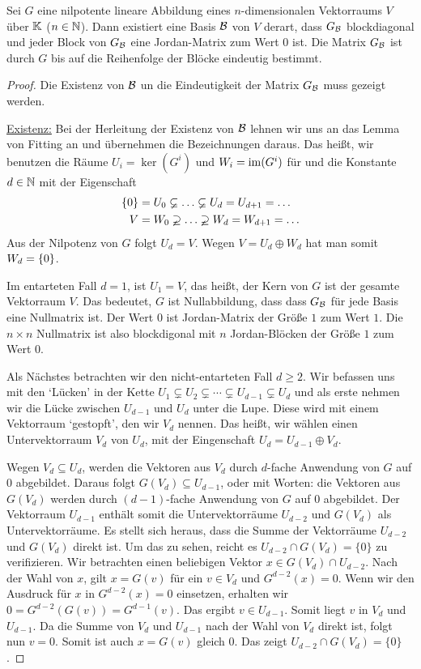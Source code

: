 \begin{thm}
	Sei $ G $ eine nilpotente lineare Abbildung eines $ n $-dimensionalen Vektorraums $ V $ über $ \mathbb K $ ($ n \in \mathbb N $). Dann existiert eine Basis $ \mathcal{B} $ von $ V $ derart, dass $ G_{\mathcal{B}} $ blockdiagonal und jeder Block von $ G_{\mathcal{B}} $ eine Jordan-Matrix zum Wert 0 ist. Die Matrix $ G_{\mathcal{B}} $ ist durch $ G $ bis auf die Reihenfolge der Blöcke eindeutig bestimmt.
\end{thm}
\begin{proof} Die Existenz von $\mathcal{B}$ un die Eindeutigkeit der Matrix $G_{\mathcal{B}}$ muss gezeigt werden. 
	
\underline{Existenz:} Bei der Herleitung der Existenz von $\mathcal{B}$ lehnen wir uns an das Lemma von Fitting an und übernehmen die Bezeichnungen daraus. 
		Das heißt, wir benutzen die Räume $ U_i = \ker(G^i) $ und $ W_i = \operatorname{im}(G^i) $ für und die Konstante $ d \in \mathbb N $ mit der Eigenschaft 
	\begin{align*}
	\left\{ 0 \right\} &= U_0 \varsubsetneq \ldots \varsubsetneq U_d = U_{d+1} = \ldots \\
	V &= W_0 \varsupsetneq \ldots \varsupsetneq W_d = W_{d+1} = \ldots
	\end{align*}
	Aus der Nilpotenz von $ G $ folgt $ U_d = V $. Wegen $ V = U_d \oplus W_d $ hat man somit $W_d = \left\{ 0 \right\}$. 
	
	Im entarteten Fall $d=1$, ist $U_1 = V$, das heißt, der Kern von $G$ ist der gesamte Vektorraum $V$. Das bedeutet, $G$ ist Nullabbildung, dass dass $G_{\mathcal{B}}$ für jede Basis eine Nullmatrix ist. Der Wert $0$ ist Jordan-Matrix der Größe $1$ zum Wert $1$. Die $n \times n$ Nullmatrix ist also blockdigonal mit $n$ Jordan-Blöcken der Größe $1$ zum Wert $0$. 
	
	Als Nächstes betrachten wir den nicht-entarteten Fall $d \ge 2$. Wir befassen uns   mit den `Lücken' in der Kette $U_1 \varsubsetneq U_2 \varsubsetneq \cdots \varsubsetneq U_{d-1} \varsubsetneq U_d$  und als erste nehmen wir die Lücke zwischen $U_{d-1}$ und $U_d$ unter die Lupe. Diese wird mit einem Vektorraum `gestopft', den wir $V_d$ nennen. Das heißt, wir wählen einen Untervektorraum $V_d$ von $U_d$, mit der Eingenschaft $U_d = U_{d-1} \oplus V_d$. 
	
	Wegen $V_d \subseteq U_d$, werden die Vektoren aus $V_d$ durch $d$-fache Anwendung von $G$ auf $0$ abgebildet. Daraus folgt $G(V_d) \subseteq U_{d-1}$, oder mit Worten: die Vektoren aus $G(V_d)$ werden durch $(d-1)$-fache Anwendung von $G$ auf $0$ abgebildet. Der Vektorraum $U_{d-1}$ enthält somit die Untervektorräume $U_{d-2}$ und $G(V_d)$ als Untervektorräume. Es stellt sich heraus, dass die Summe der Vektorräume $U_{d-2} $und $G(V_d)$ direkt ist. Um das zu sehen, reicht es $U_{d-2} \cap G(V_d) =\{0\}$ zu verifizieren. Wir betrachten einen beliebigen Vektor $x \in G(V_d) \cap U_{d-2}$. Nach der Wahl von $x$, gilt $x = G(v)$ für ein $v \in V_d$ und $G^{d-2} (x) = 0$. Wenn wir den Ausdruck für $x$ in $G^{d-2} (x) = 0$ einsetzen, erhalten wir $0 = G^{d-2}(G(v)) = G^{d-1}(v)$. Das ergibt $v \in U_{d-1}$. Somit liegt $v$ in $V_d$ und $U_{d-1}$. Da die Summe von $V_d$ und $U_{d-1}$ nach der Wahl von $V_d$ direkt ist, folgt nun $v=0$. Somit ist auch $x = G(v)$ gleich $0$. Das zeigt $U_{d-2} \cap G(V_d) = \{0\}$. 
	

\end{proof}
